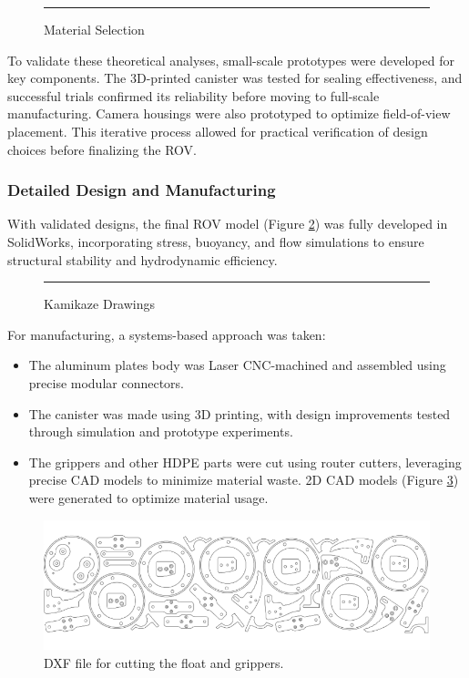 \begin{figure}[h]
    \centering
    \rule{0.8\columnwidth}{4cm}
    \caption{Material Selection}
    \label{fig:material_selection}
\end{figure}

\hspace{10pt} To validate these theoretical analyses, small-scale prototypes were developed for key components. The 3D-printed canister was tested for sealing effectiveness, and successful trials confirmed its reliability before moving to full-scale manufacturing. Camera housings were also prototyped to optimize field-of-view placement. This iterative process allowed for practical verification of design choices before finalizing the ROV.

\subsubsection{Detailed Design and Manufacturing}

With validated designs, the final ROV model (Figure \ref{fig:kamikaze_drawings}) was fully developed in SolidWorks, incorporating stress, buoyancy, and flow simulations to ensure structural stability and hydrodynamic efficiency.

\begin{figure}[h]
    \centering
    \rule{0.8\columnwidth}{4cm}
    \caption{Kamikaze Drawings}
    \label{fig:kamikaze_drawings}
\end{figure}

For manufacturing, a systems-based approach was taken:

\vspace{-0.5\baselineskip}
\begin{itemize}
    \setlength{\itemsep}{0pt}
    \item The aluminum plates body was Laser CNC-machined and assembled using precise modular connectors.
    \item The canister was made using 3D printing, with design improvements tested through simulation and prototype experiments.
    \item The grippers and other HDPE parts were cut using router cutters, leveraging precise CAD models to minimize material waste. 2D CAD models (Figure \ref{fig:dxf}) were generated to optimize material usage.
\end{itemize}

\begin{figure}[h]
    \centering
    \includegraphics[width=0.8\columnwidth]{Sections/2Design Rationale/images/DXF.png}
    \caption{DXF file for cutting the float and grippers.}
    \label{fig:dxf}
\end{figure}


